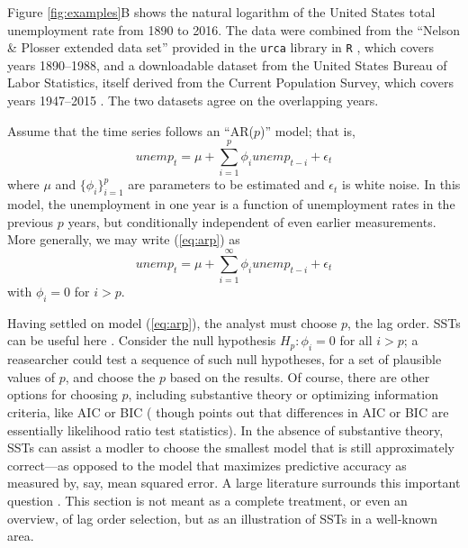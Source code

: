 \documentclass[12pt]{article}\usepackage[]{graphicx}\usepackage[]{color}
\begin{document}
Figure \ref{fig:examples}B shows the natural logarithm of the United States total
unemployment rate from 1890 to 2016.
The data were combined from the ``Nelson \& Plosser extended data
set'' provided in the \texttt{urca} library in \texttt{R}
\citep{urca,Rcite}, which covers years 1890--1988, and a downloadable
dataset from the United States Bureau of Labor Statistics, itself
derived from the Current Population Survey, which covers years
1947--2015 \citep{blsData}.
The two datasets agree on the overlapping years.

Assume that the time series follows an ``AR($p$)'' model; that is,
\begin{equation}\label{eq:arp}
unemp_t=\mu + \displaystyle\sum_{i=1}^p \phi_i unemp_{t-i}+\epsilon_t
\end{equation}
where $\mu$ and $\{\phi_i\}_{i=1}^p$ are parameters to be estimated
and $\epsilon_t$ is white noise.
In this model, the unemployment in one year is a function of
unemployment rates in the previous $p$ years, but conditionally
independent of even earlier measurements.
More generally, we may write (\ref{eq:arp}) as
\begin{equation}\label{eq:arpinf}
unemp_t=\mu+\displaystyle\sum_{i=1}^\infty \phi_i
unemp_{t-i}+\epsilon_t
\end{equation}
with $\phi_i=0$ for $i>p$.

Having settled on model (\ref{eq:arp}), the analyst must choose $p$,
the lag order.
SSTs can be useful here \citep[e.g.][]{practitionersGuide,hatemi2009can,lutkepohl2005new}.
Consider the null hypothesis $H_p: \phi_i=0$ for all $i>p$;
a reasearcher could test a sequence of such null hypotheses, for a set
of plausible values of $p$, and choose the $p$ based on the results.
Of course, there are other options for choosing $p$, including
substantive theory or optimizing
information criteria, like AIC or BIC
(\citep{akaike1969fitting,schwarz1978estimating} though
\citealt{potscher1991effects} points out that differences in AIC or
BIC are essentially likelihood ratio test statistics).
In the absence of substantive theory, SSTs can assist a modler to
choose the smallest model that is still approximately correct---as
opposed to the model that maximizes predictive accuracy as measured
by, say, mean squared error.
A large literature surrounds this important question \citep[See,
e.g.][and the citations
therein]{mcquarrie1998regression,liew2004lag}. This section is not
meant as a complete treatment, or even an overview, of lag order
selection, but as an illustration of SSTs in a well-known area.
\end{document}
